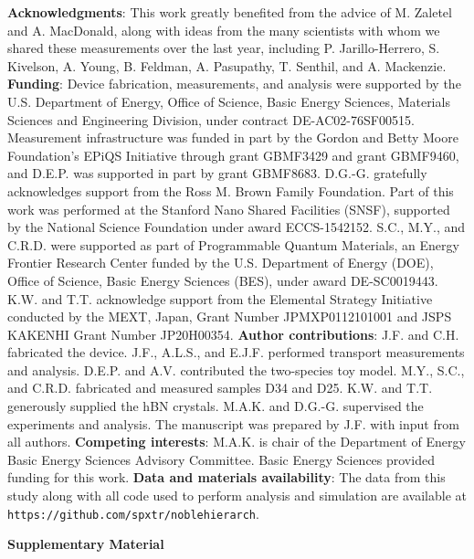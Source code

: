 \documentclass[12pt,twocolumn]{article}
\begin{document}
\noindent\textbf{Acknowledgments}: This work greatly benefited from the advice of M. Zaletel and A. MacDonald, along with ideas from the many scientists with whom we shared these measurements over the last year, including P. Jarillo-Herrero, S. Kivelson, A. Young, B. Feldman, A. Pasupathy, T. Senthil, and A. Mackenzie. \textbf{Funding}: Device fabrication, measurements, and analysis were supported by the U.S. Department of Energy, Office of Science, Basic Energy Sciences, Materials Sciences and Engineering Division, under contract DE-AC02-76SF00515. Measurement infrastructure was funded in part by the Gordon and Betty Moore Foundation’s EPiQS Initiative through grant GBMF3429 and grant GBMF9460, and D.E.P. was supported in part by grant GBMF8683. D.G.-G. gratefully acknowledges support from the Ross M. Brown Family Foundation. Part of this work was performed at the Stanford Nano Shared Facilities (SNSF), supported by the National Science Foundation under award ECCS-1542152. S.C., M.Y., and C.R.D. were supported as part of Programmable Quantum Materials, an Energy Frontier Research Center funded by the U.S. Department of Energy (DOE), Office of Science, Basic Energy Sciences (BES), under award DE-SC0019443. K.W. and T.T. acknowledge support from the Elemental Strategy Initiative conducted by the MEXT, Japan, Grant Number JPMXP0112101001 and JSPS KAKENHI Grant Number JP20H00354. \textbf{Author contributions}: J.F. and C.H. fabricated the device. J.F., A.L.S., and E.J.F. performed transport measurements and analysis. D.E.P. and A.V. contributed the two-species toy model. M.Y., S.C., and C.R.D. fabricated and measured samples D34 and D25. K.W. and T.T. generously supplied the hBN crystals. M.A.K. and D.G.-G. supervised the experiments and analysis. The manuscript was prepared by J.F. with input from all authors. \textbf{Competing interests}: M.A.K. is chair of the Department of Energy Basic Energy Sciences Advisory Committee. Basic Energy Sciences provided funding for this work. \textbf{Data and materials availability}: The data from this study along with all code used to perform analysis and simulation are available at \texttt{https://github.com/spxtr/noblehierarch}.

\onecolumn
\begin{center}
\large\textbf{Supplementary Material}
\end{center}
\end{document}
